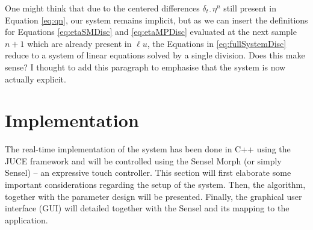 \documentclass[dvipsnames, pdftex]{article}
\def\SWcomment[#1]{\textcolor{Bittersweet}{#1}}
\begin{document}
One might think that due to the centered differences $\delta_{t\cdot}\eta^n$ still present in Equation \eqref{eq:qn}, our system remains implicit, but as we can insert the definitions for Equations \eqref{eq:etaSMDisc} and \eqref{eq:etaMPDisc} evaluated at the next sample $n+1$ which are already present in $\ell u$, the Equations in \eqref{eq:fullSystemDisc} reduce to a system of linear equations solved by a single division. \SWcomment[Does this make sense? I thought to add this paragraph to emphasise that the system is now actually explicit.]

\section{Implementation}
The real-time implementation of the system has been done in C++ using the JUCE framework \cite{JUCE2020} and will be controlled using the Sensel Morph (or simply Sensel) -- an expressive touch controller. This section will first elaborate some important considerations regarding the setup of the system. Then, the algorithm, together with the parameter design will be presented.  Finally, the graphical user interface (GUI) will detailed together with the Sensel and its mapping to the application.
\end{document}
